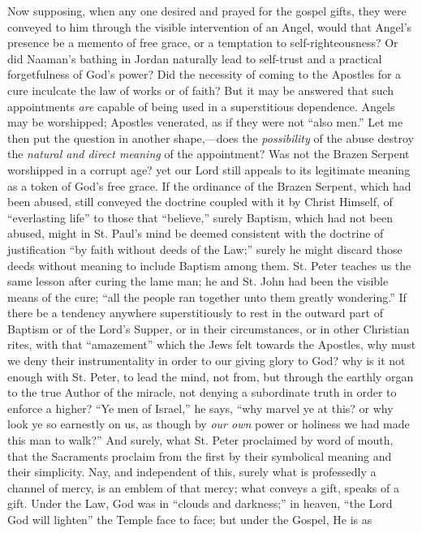 Now supposing, when any one desired and prayed for the gospel
gifts, they were conveyed to him through the visible intervention of
an Angel, would that Angel's presence be a memento of free grace, or a
temptation to self-righteousness? Or did Naaman's bathing in Jordan
naturally lead to self-trust and a practical forgetfulness of
God's power? Did the necessity of coming to the Apostles for a cure
inculcate the law of works or of faith? But it may be answered that
such appointments \emph{are} capable of being used in a superstitious
dependence. Angels may be worshipped; Apostles venerated, as if they
were not ``also men.'' Let me then put the question in another
shape,—does the \emph{possibility} of the abuse destroy the \emph{natural
and direct meaning} of the appointment? Was not the Brazen Serpent
worshipped in a corrupt age? yet our Lord still appeals to its
legitimate meaning as a token of God's free grace. If the ordinance of
the Brazen Serpent, which had been abused, still conveyed the doctrine
coupled with it by Christ Himself, of ``everlasting life'' to
those that ``believe,'' surely Baptism, which had not been
abused, might in St. Paul's mind be deemed consistent with the
doctrine of justification ``by faith without deeds of the
Law;'' surely he might discard those deeds without meaning to
include Baptism among them. St. Peter teaches us the same lesson after
curing the lame man; he and St. John had been the visible means of the
cure; ``all the people ran together unto them greatly
wondering.'' If there be a tendency anywhere superstitiously to
rest in the outward part of Baptism or of the Lord's Supper, or in
their circumstances, or in other Christian rites, with that
``amazement'' which the Jews felt towards the Apostles, why
must we deny their instrumentality in order to our giving glory to
God? why is it not enough with St. Peter, to lead the mind, not from,
but through the earthly organ to the true Author of the miracle, not
denying a subordinate truth in order to enforce a higher? ``Ye men
of Israel,'' he says, ``why marvel ye at this? or why look ye
so earnestly on us, as though by \emph{our own} power or holiness we
had made this man to walk?'' And surely, what St. Peter proclaimed
by word of mouth, that the Sacraments proclaim from the first by their
symbolical meaning and their simplicity. Nay, and independent of this,
surely what is professedly a channel of mercy, is an emblem of that
mercy; what conveys a gift, speaks of a gift. Under the Law, God was
in ``clouds and darkness;'' in heaven, ``the Lord God will
lighten'' the Temple face to face; but under the Gospel, He is as
